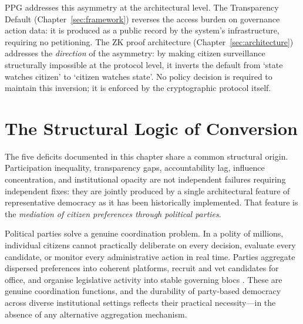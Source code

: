 \documentclass[12pt,a4paper,oneside]{report}
\begin{document}
PPG addresses this asymmetry at the architectural level. The Transparency Default (Chapter~\ref{sec:framework}) reverses the access burden on governance action data: it is produced as a public record by the system's infrastructure, requiring no petitioning. The ZK proof architecture (Chapter~\ref{sec:architecture}) addresses the \emph{direction} of the asymmetry: by making citizen surveillance structurally impossible at the protocol level, it inverts the default from `state watches citizen' to `citizen watches state'. No policy decision is required to maintain this inversion; it is enforced by the cryptographic protocol itself.

\section{The Structural Logic of Conversion}
\label{sec:conversion}

The five deficits documented in this chapter share a common structural origin. Participation inequality, transparency gaps, accountability lag, influence concentration, and institutional opacity are not independent failures requiring independent fixes: they are jointly produced by a single architectural feature of representative democracy as it has been historically implemented. That feature is the \emph{mediation of citizen preferences through political parties}.

Political parties solve a genuine coordination problem. In a polity of millions, individual citizens cannot practically deliberate on every decision, evaluate every candidate, or monitor every administrative action in real time. Parties aggregate dispersed preferences into coherent platforms, recruit and vet candidates for office, and organise legislative activity into stable governing blocs \citep{downs1957economic}. These are genuine coordination functions, and the durability of party-based democracy across diverse institutional settings reflects their practical necessity---in the absence of any alternative aggregation mechanism.
\end{document}
